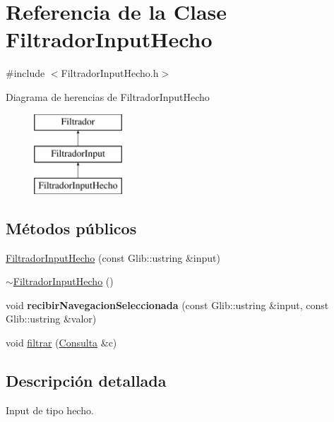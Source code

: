 \hypertarget{classFiltradorInputHecho}{\section{\-Referencia de la \-Clase \-Filtrador\-Input\-Hecho}
\label{classFiltradorInputHecho}
}


{\ttfamily \#include $<$\-Filtrador\-Input\-Hecho.\-h$>$}

\-Diagrama de herencias de \-Filtrador\-Input\-Hecho\begin{figure}[H]
\begin{center}
\leavevmode
\includegraphics[height=3.000000cm]{classFiltradorInputHecho}
\end{center}
\end{figure}
\subsection*{\-Métodos públicos}
\begin{DoxyCompactItemize}
\item 
\hyperlink{classFiltradorInputHecho_a24dd6f3beba32f9b2e6a988174513cd3}{\-Filtrador\-Input\-Hecho} (const \-Glib\-::ustring \&input)
\item 
\hyperlink{classFiltradorInputHecho_a3abb02b0b016bd2d58012c41ae21bfad}{$\sim$\-Filtrador\-Input\-Hecho} ()
\item 
\hypertarget{classFiltradorInputHecho_a0f17d36d1e33e28e348d317168fa8301}{void {\bfseries recibir\-Navegacion\-Seleccionada} (const \-Glib\-::ustring \&input, const \-Glib\-::ustring \&valor)}\label{classFiltradorInputHecho_a0f17d36d1e33e28e348d317168fa8301}

\item 
void \hyperlink{classFiltradorInputHecho_adaaa9cddc3f560961b108acfc8a002f9}{filtrar} (\hyperlink{classConsulta}{\-Consulta} \&c)
\end{DoxyCompactItemize}


\subsection{\-Descripción detallada}
\-Input de tipo hecho. 

